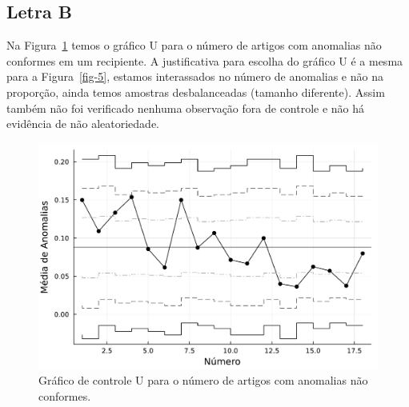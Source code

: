 \documentclass[
  letterpaper,
  DIV=11,
  numbers=noendperiod]{scrartcl}
\begin{document}
\hypertarget{letra-b-1}{%
\subsection{Letra B}\label{letra-b-1}}

Na Figura~\ref{fig-6} temos o gráfico U para o número de artigos com
anomalias não conformes em um recipiente. A justificativa para escolha
do gráfico U é a mesma para a Figura~\ref{fig-5}, estamos interassados
no número de anomalias e não na proporção, ainda temos amostras
desbalanceadas (tamanho diferente). Assim também não foi verificado
nenhuma observação fora de controle e não há evidência de não
aleatoriedade.

\begin{figure}[H]

{\centering \includegraphics{relatorio_files/figure-pdf/fig-6-J1.pdf}

}

\caption{\label{fig-6}Gráfico de controle U para o número de artigos com
anomalias não conformes.}

\end{figure}
\end{document}
